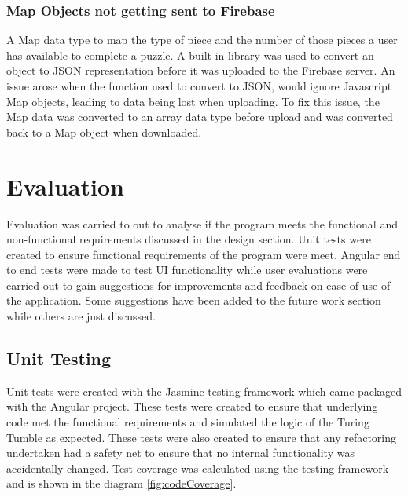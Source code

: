 \documentclass{l4proj}
\begin{document}
\subsection{Map Objects not getting sent to Firebase}
A Map data type to map the type of piece and the number of those pieces a user has available to complete a puzzle. A built in library was used to convert an object to JSON representation before it was uploaded to the Firebase server. An issue arose when the function used to convert to JSON, would ignore Javascript Map objects, leading to data being lost when uploading. To fix this issue, the Map data was converted to an array data type before upload and was converted back to a Map object when downloaded.

\chapter{Evaluation}

Evaluation was carried to out to analyse if the program meets the functional and non-functional requirements discussed in the design section. Unit tests were created to ensure functional requirements of the program were meet. Angular end to end tests were made to test UI functionality while user evaluations were carried out to gain suggestions for improvements and feedback on ease of use of the application. Some suggestions have been added to the future work section while others are just discussed. 

\section{Unit Testing}
Unit tests were created with the Jasmine testing framework which came packaged with the Angular project. These tests were created to ensure that underlying code met the functional requirements and simulated the logic of the Turing Tumble as expected. These tests were also created to ensure that any refactoring undertaken had a safety net to ensure that no internal functionality was accidentally changed. Test coverage was calculated using the testing framework and is shown in the diagram \ref{fig:codeCoverage}. 
\end{document}
